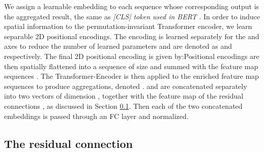 \documentclass[10pt,journal]{IEEEtran}\usepackage{amsfonts}
\begin{document}
We assign a learnable embedding to each sequence whose corresponding output
is the aggregated result, the same as \emph{[CLS] token used in BERT} \cite {bert}. In order to induce spatial information to the permutation-invariant
Transformer encoder, we learn separable 2D positional encodings. The
encoding is learned separately for the  and  axes to reduce the number
of learned parameters and are denoted as  and  respectively.
The final 2D positional encoding  is given by:Positional encodings are then spatially flattened into a sequence of size  and summed with
the feature map sequences . The Transformer-Encoder is then applied to the enriched feature
map sequences to produce  aggregations, denoted . 
and  are concatenated separately into
two vectors of dimension , together with the
feature map of the residual connections , as discussed in Section \ref{subsec:residual_connection}. Then each of
the two concatenated embeddings is passed through an FC layer and 
normalized.

\subsection{The residual connection}

\label{subsec:residual_connection}
\end{document}
